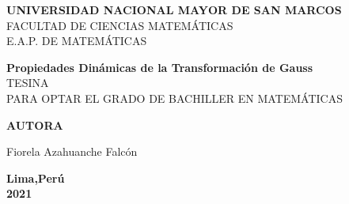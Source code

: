 \documentclass[12pt]{report}
\begin{document}

\begin{titlepage}
 
\begin{center}
 
 {\large \bf UNIVERSIDAD NACIONAL MAYOR DE SAN MARCOS}\\
 
{\large FACULTAD DE CIENCIAS MATEMÁTICAS}\\{\large E.A.P. DE MATEMÁTICAS}\\[2.0cm]



\vspace{1cm}
\title{} %
{\bf \Large Propiedades Dinámicas de la Transformación de Gauss }\\[1.5cm] %

{TESINA}\\[0.5cm]
{PARA OPTAR EL GRADO DE BACHILLER EN MATEMÁTICAS}\\[1.5cm]
 
\vspace{2cm} 

        
        {\large \textbf{ AUTORA }}\\
        
        \vspace{5mm}
        
        {\Large Fiorela Azahuanche Falcón}
        
        \vspace{50mm}
        
        
        
        {\Large \textbf{ Lima,Perú }}\\
        
        \vspace{3mm}
        {\Huge \textbf{2021}}
\end{center}

\end{titlepage}
\end{document}
